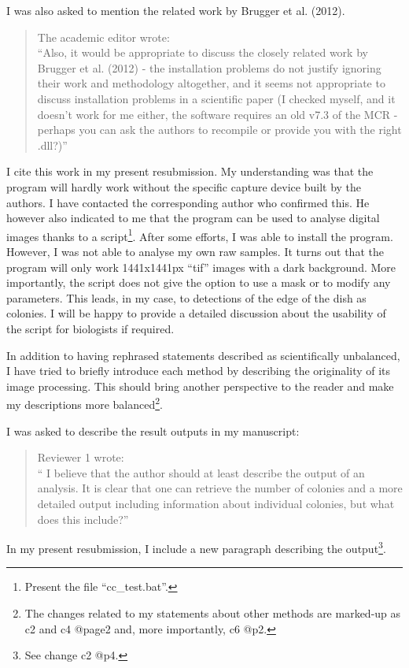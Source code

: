 \documentclass{letter}
\makeatletter
\newcommand{\CMinorBalancedChanges}{c2 and c4 @page2}
\newcommand{\CMajorBalancedChanges}{c6 @p2}
\newcommand{\COutputDescrib}{c2 @p4}
\makeatother
\begin{document}
\begin{letter}{}
I was also asked to mention the related work by Brugger et al. (2012).
\begin{quote}
The academic editor wrote:\\
``Also, it would be appropriate to discuss the closely related work by Brugger et al. (2012)
 - the installation problems do not justify ignoring their work and methodology altogether, 
 and it seems not appropriate to discuss installation problems in a scientific paper (I checked myself, and it doesn't work for me either,
  the software requires an old v7.3 of the MCR - 
 perhaps you can ask the authors to recompile or provide you with the right .dll?)''
\end{quote}
 I cite this work in my present resubmission.
 My understanding was that the program will hardly work without the specific 
 capture device built by the authors.
 I have contacted the corresponding author 
who  
confirmed this.
 He however also indicated 
to
me that the program can be used to analyse digital
images thanks to a script\footnote{Present the file ``cc\_test.bat''.}.
 After some efforts, I was able to install the program.
 However, I was not able 
to analyse my own raw samples.
 It turns out that the program will only work 1441x1441px ``tif'' images with 
a dark background.  More importantly, the script does not give
the option to use a mask or to modify any parameters. This leads, in my case, to detections of the edge of the dish as colonies. I will be happy to provide a detailed discussion about the usability of the script for
 biologists if required.

In addition to having rephrased statements described as scientifically unbalanced, I have tried to briefly
introduce each method by describing the originality of its image processing. This should bring
another perspective to the reader and
make my descriptions more 
balanced\footnote{The changes related to my statements about
other methods are marked-up as \CMinorBalancedChanges{} and, 
more importantly, \CMajorBalancedChanges{}.}.

I was asked to describe the result outputs in my manuscript:
\begin{quote}
Reviewer 1 wrote:\\
`` I believe that the author should at least describe the output of an analysis.
 It is clear that one can retrieve the number of colonies and a more detailed output
  including information about individual colonies, but what does this include?''
\end{quote}
In my present resubmission, 
I include a new paragraph describing the output\footnote{See change  \COutputDescrib{}.}.
 

\end{letter}
\end{document}
